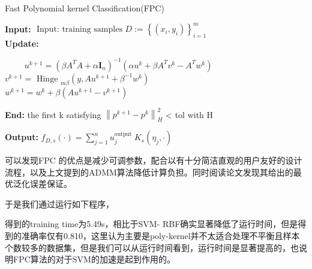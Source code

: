 \documentclass{zjureport}
\begin{document}
    \begin{algorithm}[H]
    \caption{Fast Polynomial kernel Classification(FPC)} %
    \hspace*{0.02in} {\bf Input:} %
    $\text { Input: training samples } D:=\left\{\left(x_{i}, y_{i}\right)\right\}_{i=1}^{m}$\\
    \hspace*{0.02in} {\bf Update:} %
    \begin{algorithmic}[1]
 
    　　\State  
$u^{k+1}=\left(\beta A^{T} A+\alpha \mathbf{I}_{n}\right)^{-1}\left(\alpha u^{k}+\beta A^{T} v^{k}-A^{T} w^{k}\right) $\\

$v^{k+1}=\text { Hinge }_{m \beta}\left(y, A u^{k+1}+\beta^{-1} w^{k}\right)$ \\

$w^{k+1}=w^{k}+\beta\left(A u^{k+1}-v^{k+1}\right) $

    \EndFor

    \end{algorithmic}
    \hspace*{0.02in} {\bf End:}
      the first k satisfying  $\left\|p^{k+1}-p^{k}\right\|_{H}^{2}$ < tol with H 
 
    \hspace*{0.02in} {\bf Output:}
     $f_{D, s}(\cdot)=\sum_{j=1}^{n} u_{j}^{\text {output }} K_{s}\left(\eta_{j}, \cdot\right)$
    \end{algorithm}       
        
        可以发现FPC 的优点是减少可调参数，配合以有十分简洁直观的用户友好的设计流程，以及上文提到的ADMM算法降低计算负担。同时阅读论文发现其给出的最优泛化误差保证。
        
        于是我们通过运行如下程序，
        

        得到的training time为5.49s，相比于SVM- RBF确实显著降低了运行时间，但是得到的准确率仅有0.810，这里认为主要是poly-kernel并不太适合处理不平衡且样本个数较多的数据集，但是我们可以从运行时间看到，运行时间是显著提高的，也说明FPC算法的对于SVM的加速是起到作用的。
\end{document}
